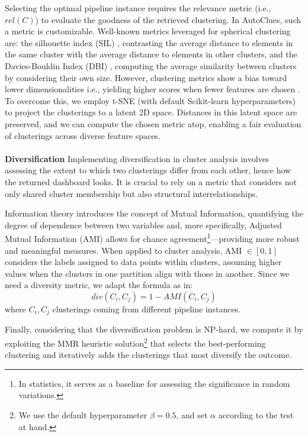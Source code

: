 \documentclass[runningheads]{llncs}
\begin{document}
Selecting the optimal pipeline instance requires the relevance metric (i.e., $rel(C)$) to evaluate the goodness of the retrieved clustering.
In AutoClues, such a metric is customizable.
Well-known metrics leveraged for spherical clustering are: the silhouette index (SIL) \cite{zhu2010clustering}, contrasting the average distance to elements in the same cluster with the average distance to elements in other clusters, and the Davies-Bouldin Index (DBI) \cite{dbi}, computing the average similarity between clusters by considering their own size.
However, clustering metrics show a bias toward lower dimensionalities i.e., yielding higher scores when fewer features are chosen \cite{lensen2017using,hancer2020new}. 
To overcome this, we employ t-SNE \cite{van2008visualizing} (with default Scikit-learn hyperparameters) to project the clusterings to a latent 2D space.
Distances in this latent space are preserved, and we can compute the chosen metric atop, enabling a fair evaluation of clusterings across diverse feature spaces.
%
\\
\\
\textbf{Diversification}
Implementing diversification in cluster analysis involves assessing the extent to which two clusterings differ from each other, hence how the returned dashboard looks.
It is crucial to rely on a metric that considers not only shared cluster membership but also structural interrelationships.

Information theory introduces the concept of Mutual Information, quantifying the degree of dependence between two variables and, more specifically, Adjusted Mutual Information (AMI) allows for chance agreement\footnote{In statistics, it serves as a baseline for assessing the significance in random variations.}---providing more robust and meaningful measures.
When applied to cluster analysis, AMI $\in [0, 1]$ considers the labels assigned to data points within clusters, assuming higher values when the clusters in one partition align with those in another.
Since we need a diversity metric, we adapt the formula as in:
$$div(C_i, C_j) = 1- AMI(C_i, C_j)$$ 
where $C_i, C_j$ clusterings coming from different pipeline instances.

Finally, considering that the diversification problem is NP-hard, we compute it by exploiting the MMR heuristic solution\footnote{We use the default hyperparameter $\beta = 0.5$, and set $\alpha$ according to the test at hand.} \cite{vieira2011query} that selects the best-performing clustering and iteratively adds the clusterings that most diversify the outcome.
\end{document}
